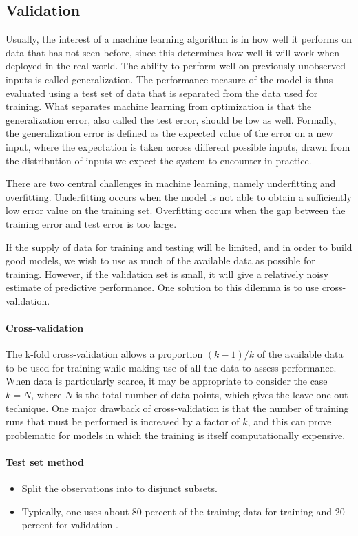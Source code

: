 \documentclass{scrartcl}
\begin{document}
\subsection{Validation}

Usually, the interest of a machine learning algorithm is in how well it performs on data that has not seen before, since this determines how well it will work when deployed in the real world. The ability to perform well on previously unobserved inputs is called generalization. The performance measure of the model is thus evaluated using a test set of data that is separated from the data used for training. What separates machine learning from optimization is that the generalization error, also called the test error, should be low as well. Formally, the generalization error is defined as the expected value of the error on a new input, where the expectation is taken across different possible inputs, drawn from the distribution of inputs we expect the system to encounter in practice.

There are two central challenges in machine learning, namely underfitting and overfitting. Underfitting occurs when the model is not able to obtain a sufficiently low error value on the training set. Overfitting occurs when the gap between the training error and test error is too large.

If the supply of data for training and testing will be limited, and in order to build good models, we wish to use as much of the available data as possible for training. However, if the validation set is small, it will give a relatively noisy estimate of predictive performance. One solution to this dilemma is to use cross-validation.

\paragraph{Cross-validation}  The k-fold cross-validation allows a proportion $(k-1)/k$ of the available data to be used for training while making use of all the data to assess performance. When data is particularly scarce, it may be appropriate to consider the case $k=N$, where $N$ is the total number of data points, which gives the leave-one-out technique. One major drawback of cross-validation is that the number of training runs that must be performed is increased by a factor of $k$, and this can prove problematic for models in which the training is itself computationally expensive.

\paragraph{Test set method} 
\begin{itemize}
\item Split the observations into to disjunct subsets.
\item Typically, one uses about 80 percent of the training data for training and 20 percent for validation \cite{Goodfellow2016}. 
\end{itemize}
\end{document}
